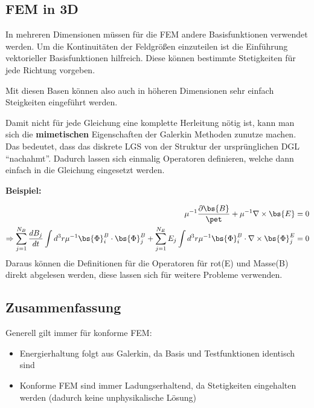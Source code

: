 \newpage

\subsection{FEM in 3D}
In mehreren Dimensionen m\"ussen f\"ur die FEM andere Basisfunktionen verwendet werden. Um die Kontinuit\"aten der Feldgr\"o\ss{}en einzuteilen ist die Einf\"uhrung vektorieller Basisfunktionen hilfreich. Diese k\"onnen bestimmte Stetigkeiten f\"ur jede Richtung vorgeben.
\par
\begin{figure}[ht]
	\centering
	\hspace{0.1\textwidth}
\end{figure}
Mit diesen Basen k\"onnen also auch in h\"oheren Dimensionen sehr einfach Steigkeiten eingef\"uhrt werden.
\par
Damit nicht f\"ur jede Gleichung eine komplette Herleitung n\"otig ist, kann man sich die \textbf{mimetischen} Eigenschaften der Galerkin Methoden zunutze machen. Das bedeutet, dass das diskrete LGS von der Struktur der urspr\"unglichen DGL ``nachahmt''. Dadurch lassen sich einmalig Operatoren definieren, welche dann einfach in die Gleichung eingesetzt werden.
\par
\textbf{Beispiel:}
\par
\begin{align*}
	\mu^{-1}\frac{\partial\bs{B}}{\pet} + \mu^{-1}\nabla\times\bs{E} &= 0 \\
	\Rightarrow \sum_{j=1}^{N_B}\frac{dB_j}{dt}\int d^3r\mu^{-1}\bs{\Phi}_i^B\cdot\bs{\Phi}^B_j + \sum_{j=1}^{N_E}E_j\int d^3r\mu^{-1}\bs{\Phi}^B_i\cdot\nabla\times\bs{\Phi}_j^E &= 0
\end{align*}
Daraus k\"onnen die Definitionen f\"ur die Operatoren f\"ur rot(E) und Masse(B) direkt abgelesen werden, diese lassen sich f\"ur weitere Probleme verwenden.
\subsection{Zusammenfassung}
Generell gilt immer f\"ur konforme FEM:
\begin{itemize}
	\item Energierhaltung folgt aus Galerkin, da Basis und Testfunktionen identisch sind
	\item Konforme FEM sind immer Ladungserhaltend, da Stetigkeiten eingehalten werden (dadurch keine unphysikalische L\"osung)
\end{itemize}





